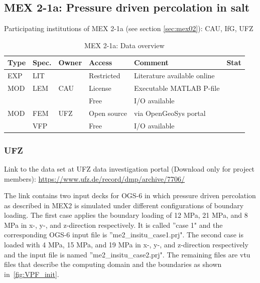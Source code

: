 \subsection{MEX 2-1a: Pressure driven percolation in salt}

Participating institutions of MEX 2-1a (see section \ref{sec:mex02}): CAU, IfG, UFZ

\begin{table}[ht!]
\caption{MEX 2-1a: Data overview}
\label{tab:dms-mex21a-overview}
\small
\begin{tabular}{l|l|l|l|L{4.7cm}|l}
\hline
{}
Type & Spec. & Owner & Access     & Comment                       & Stat \\ 
\hline 
EXP  & LIT   & \cite{Kamlot2009} & Restricted & Literature available online &  \\
\hline \hline
MOD  & LEM   & CAU   & License    & Executable MATLAB P-file      &  \\
     &       &       & Free       & I/O available                 &  \\
\hline
MOD  & FEM   & UFZ   & Open source & via OpenGeoSys portal        &  \\
     & VFP   &       & Free        & I/O available                &  \\
%
\hline
\end{tabular}
\end{table}
\normalsize

\subsubsection*{UFZ}

Link to the data set at UFZ data investigation portal (Download only for project members):
\url{https://www.ufz.de/record/dmp/archive/7706/}

The link contains two input decks for OGS-6 in which pressure driven percolation as described in MEX2 is simulated under different configurations of boundary loading.
The first case applies the boundary loading of 12 MPa, 21 MPa, and 8 MPa in x-, y-, and z-direction respectively. It is called ''case 1" and the corresponding OGS-6 input file is ''me2\_insitu\_case1.prj".
The second case is loaded with 4 MPa, 15 MPa, and 19 MPa in x-, y-, and z-direction respectively and the input file is named ''me2\_insitu\_case2.prj".
The remaining files are vtu files that describe the computing domain and the boundaries as shown in~\ref{fig:VPF_init}.

